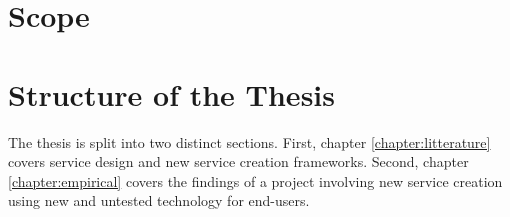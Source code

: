 \section{Scope}
\label{section:scope}




\section{Structure of the Thesis}
\label{section:structure}

The thesis is split into two distinct sections. First, chapter \ref{chapter:litterature} covers service design and new service creation frameworks. Second, chapter \ref{chapter:empirical} covers the findings of a project involving new service creation using new and untested technology for end-users.


